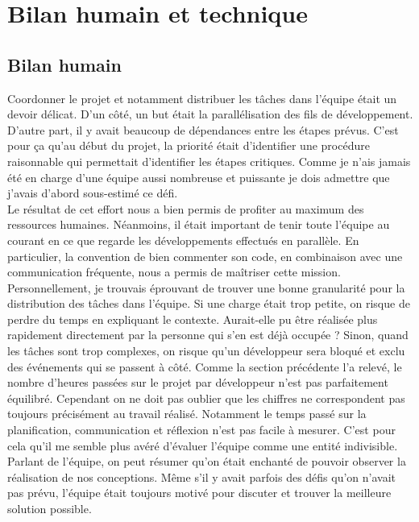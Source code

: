 \documentclass[10pt,a4paper]{book}
\begin{document}
\section{Bilan humain et technique}
\subsection{Bilan humain}
Coordonner le projet et notamment distribuer les tâches dans l'équipe était un devoir délicat. D'un côté, un but était la parallélisation des fils de développement. D'autre part, il y avait beaucoup de dépendances entre les étapes prévus. C'est pour ça qu'au début du projet, la priorité était d'identifier une procédure raisonnable qui permettait d'identifier les étapes critiques. Comme je n'ais jamais été en charge d'une équipe aussi nombreuse et puissante je dois admettre que j'avais d'abord sous-estimé ce défi.\\
Le résultat de cet effort nous a bien permis de profiter au maximum des ressources humaines. Néanmoins, il était important de tenir toute l'équipe au courant en ce que regarde les développements effectués en parallèle. En particulier, la convention de bien commenter son code, en combinaison avec une communication fréquente, nous a permis de maîtriser cette mission.\\
Personnellement, je trouvais éprouvant de trouver une bonne granularité pour la distribution des tâches dans l'équipe. Si une charge était trop petite, on risque de perdre du temps en expliquant le contexte. Aurait-elle pu être réalisée plus rapidement directement par la personne qui s'en est déjà occupée ? Sinon, quand les tâches sont trop complexes, on risque qu'un développeur sera bloqué et exclu des événements qui se passent à côté. Comme la section précédente l'a relevé, le nombre d'heures passées sur le projet par développeur n'est pas parfaitement équilibré. Cependant on ne doit pas oublier que les chiffres ne correspondent pas toujours précisément au travail réalisé. Notamment le temps passé sur la planification, communication et réflexion n'est pas facile à mesurer. C'est pour cela qu'il me semble plus avéré d'évaluer l'équipe comme une entité indivisible.\\
Parlant de l'équipe, on peut résumer qu'on était enchanté de pouvoir observer la réalisation de nos conceptions. Même s'il y avait parfois des défis qu'on n'avait pas prévu, l'équipe était toujours motivé pour discuter et trouver la meilleure solution possible.
\end{document}
